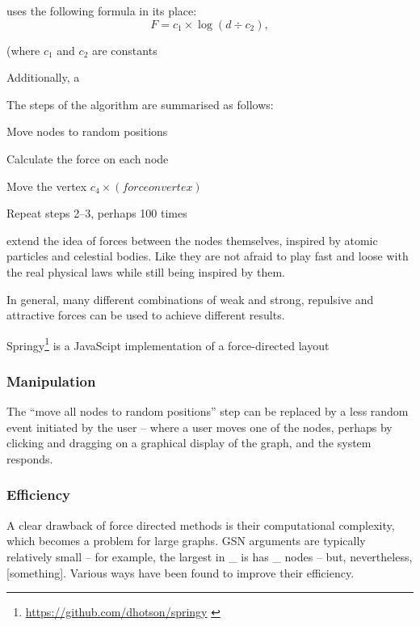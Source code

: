 \citeauthor{eades84} uses the following formula in its place:
$$
F = c_1 \times \log(d \div c_2),
$$

(where $c_1$ and $c_2$ are constants

Additionally, a 

The steps of the algorithm are summarised as follows:

\begin{enumerate*}
\item Move nodes to random positions
\item Calculate the force on each node
\item Move the vertex $c_4 \times (force on vertex)$
\item Repeat steps 2--3, perhaps 100 times
\end{enumerate*}



\citet{SPE:SPE4380211102} extend the idea of forces between the nodes themselves, inspired by atomic particles and celestial bodies. Like \citeauthor{eades84} they are not afraid to play fast and loose with the real physical laws while still being inspired by them. 

In general, many different combinations of weak and strong, repulsive and attractive forces can be used to achieve different results.

Springy\footnote{\url{https://github.com/dhotson/springy} \label{fn:springy}} is a JavaScipt implementation of a force-directed layout  

\subsubsection{Manipulation}

The ``move all nodes to random positions'' step can be replaced by a less random event initiated by the user -- where a user moves one of the nodes, perhaps by clicking and dragging on a graphical display of the graph, and the system responds.

\subsubsection{Efficiency}

A clear drawback of force directed methods is their computational complexity, which becomes a problem for large graphs.
GSN arguments are typically relatively small -- for example, the largest in \_ is has \_ nodes -- but, nevertheless, [something].
Various ways have been found to improve their efficiency.

